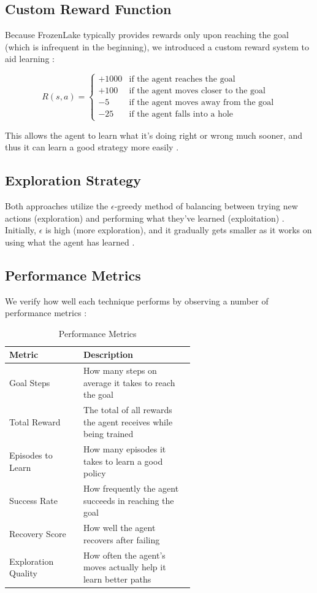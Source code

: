 \documentclass[conference]{IEEEtran}
\begin{document}
\subsection{Custom Reward Function}
Because FrozenLake typically provides rewards only upon reaching the goal (which is infrequent in the beginning), we introduced a custom reward system to aid learning \cite{Ng1999}:

\begin{equation}
R(s,a) = 
\begin{cases} 
+1000 & \text{if the agent reaches the goal} \\
+100 & \text{if the agent moves closer to the goal} \\
-5 & \text{if the agent moves away from the goal} \\
-25 & \text{if the agent falls into a hole}
\end{cases}
\end{equation}

This allows the agent to learn what it's doing right or wrong much sooner, and thus it can learn a good strategy more easily \cite{Devlin2011}.

\subsection{Exploration Strategy}
Both approaches utilize the $\epsilon$-greedy method of balancing between trying new actions (exploration) and performing what they've learned (exploitation) \cite{SuttonBarto2018}. Initially, $\epsilon$ is high (more exploration), and it gradually gets smaller as it works on using what the agent has learned \cite{Melo2001}.

\subsection{Performance Metrics}
We verify how well each technique performs by observing a number of performance metrics \cite{Henderson2018}:

\begin{table}[h]
\centering
\caption{Performance Metrics \cite{Henderson2018}}
\label{tab:metrics}
\begin{tabular}{@{}lp{0.6\linewidth}@{}}
\toprule
\textbf{Metric} & \textbf{Description} \\ \midrule
Goal Steps & How many steps on average it takes to reach the goal \\
Total Reward & The total of all rewards the agent receives while being trained \\
Episodes to Learn & How many episodes it takes to learn a good policy \\
Success Rate & How frequently the agent succeeds in reaching the goal \\
Recovery Score & How well the agent recovers after failing \\
Exploration Quality & How often the agent's moves actually help it learn better paths \\ \bottomrule
\end{tabular}
\end{table}
\end{document}
